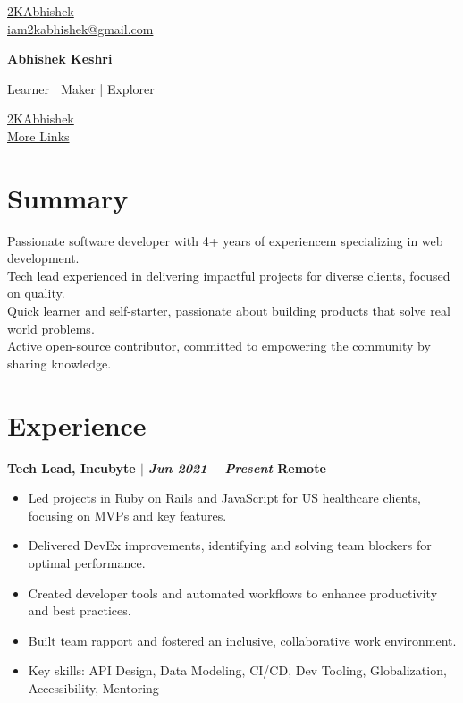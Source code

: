 \documentclass[11pt]{article} %
\newcommand{\uthree}[4]{
    {\large
        {\bfseries #1 $|$ \textit{#2} \hfill #3} \par
    }
    \begin{itemize}
        #4
    \end{itemize}
    \par\addvspace{2.5ex}%
}
\begin{document}
\begin{multicols}{3}
  \begin{flushleft}
    \color{gray}{\faGithub} \href{https://github.com/2kabhishek}{2KAbhishek} \\
    \color{gray}{\faEnvelope} \href{mailto:iam2kabhishek@gmail.com}{iam2kabhishek@gmail.com} \\
  \end{flushleft}

\columnbreak

  \begin{center}
      {\huge\bfseries Abhishek Keshri} \par
      Learner | Maker | Explorer \par
  \end{center}

\columnbreak

  \begin{flushright}
    \href{https://linkedin.com/in/2kabhishek/}{2KAbhishek} {\color{gray}{\faLinkedin}} \\
    \href{https://2kabhishek.github.io/links}{More Links} {\textcolor{gray}{\faLink}} \\
  \end{flushright}
\end{multicols}

\section{Summary}
Passionate software developer with 4+ years of experiencem specializing in web development.\\
Tech lead experienced in delivering impactful projects for diverse clients, focused on quality.\\
Quick learner and self-starter, passionate about building products that solve real world problems.\\
Active open-source contributor, committed to empowering the community by sharing knowledge.

\section{Experience}
\uthree{Tech Lead, Incubyte}{Jun 2021 -- Present}{Remote}{
  \item Led projects in Ruby on Rails and JavaScript for US healthcare clients, focusing on MVPs and key features.
  \item Delivered DevEx improvements, identifying and solving team blockers for optimal performance.
  \item Created developer tools and automated workflows to enhance productivity and best practices.
  \item Built team rapport and fostered an inclusive, collaborative work environment.
  \item Key skills: API Design, Data Modeling, CI/CD, Dev Tooling, Globalization, Accessibility, Mentoring
}
\end{document}
